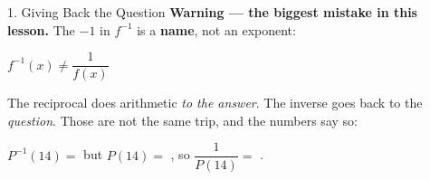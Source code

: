 \documentclass[10pt]{article}
\begin{document}
\begin{notesbox}{1. Giving Back the Question}
\medskip
\textbf{Warning --- the biggest mistake in this lesson.} The $-1$ in $f^{-1}$
is a \textbf{name}, not an exponent:

\begin{center}
$f^{-1}(x) \ne \dfrac{1}{f(x)}$
\end{center}

The reciprocal does arithmetic \textit{to the answer}. The inverse goes back to
the \textit{question}. Those are not the same trip, and the numbers say so:

\smallskip
$P^{-1}(14) = $ \blank{1.4cm} \qquad but \qquad $P(14) = $ \blank{1.4cm},
so $\dfrac{1}{P(14)} = $ \blank{1.6cm}.
\end{notesbox}

\vspace{0.1in}

\boxguard[26]
\end{document}
